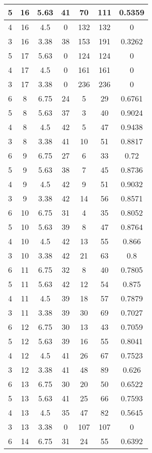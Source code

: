\documentclass[letterpaper, 12pt]{article}
\begin{document}
\begin{longtable}{|c|c|c|c|c|c|c|}
\hline
5 & 16 & 5.63 & 41 & 70 & 111 & 0.5359 \\
\hline
4 & 16 & 4.5 & 0 & 132 & 132 & 0 \\
\hline
3 & 16 & 3.38 & 38 & 153 & 191 & 0.3262 \\
\hline
5 & 17 & 5.63 & 0 & 124 & 124 & 0 \\
\hline
4 & 17 & 4.5 & 0 & 161 & 161 & 0 \\
\hline
3 & 17 & 3.38 & 0 & 236 & 236 & 0 \\
\hline
6 & 8 & 6.75 & 24 & 5 & 29 & 0.6761 \\
\hline
5 & 8 & 5.63 & 37 & 3 & 40 & 0.9024 \\
\hline
4 & 8 & 4.5 & 42 & 5 & 47 & 0.9438 \\
\hline
3 & 8 & 3.38 & 41 & 10 & 51 & 0.8817 \\
\hline
6 & 9 & 6.75 & 27 & 6 & 33 & 0.72 \\
\hline
5 & 9 & 5.63 & 38 & 7 & 45 & 0.8736 \\
\hline
4 & 9 & 4.5 & 42 & 9 & 51 & 0.9032 \\
\hline
3 & 9 & 3.38 & 42 & 14 & 56 & 0.8571 \\
\hline
6 & 10 & 6.75 & 31 & 4 & 35 & 0.8052 \\
\hline
5 & 10 & 5.63 & 39 & 8 & 47 & 0.8764 \\
\hline
4 & 10 & 4.5 & 42 & 13 & 55 & 0.866 \\
\hline
3 & 10 & 3.38 & 42 & 21 & 63 & 0.8 \\
\hline
6 & 11 & 6.75 & 32 & 8 & 40 & 0.7805 \\
\hline
5 & 11 & 5.63 & 42 & 12 & 54 & 0.875 \\
\hline
4 & 11 & 4.5 & 39 & 18 & 57 & 0.7879 \\
\hline
3 & 11 & 3.38 & 39 & 30 & 69 & 0.7027 \\
\hline
6 & 12 & 6.75 & 30 & 13 & 43 & 0.7059 \\
\hline
5 & 12 & 5.63 & 39 & 16 & 55 & 0.8041 \\
\hline
4 & 12 & 4.5 & 41 & 26 & 67 & 0.7523 \\
\hline
3 & 12 & 3.38 & 41 & 48 & 89 & 0.626 \\
\hline
6 & 13 & 6.75 & 30 & 20 & 50 & 0.6522 \\
\hline
5 & 13 & 5.63 & 41 & 25 & 66 & 0.7593 \\
\hline
4 & 13 & 4.5 & 35 & 47 & 82 & 0.5645 \\
\hline
3 & 13 & 3.38 & 0 & 107 & 107 & 0 \\
\hline
6 & 14 & 6.75 & 31 & 24 & 55 & 0.6392 \\

\end{longtable}
\end{document}
